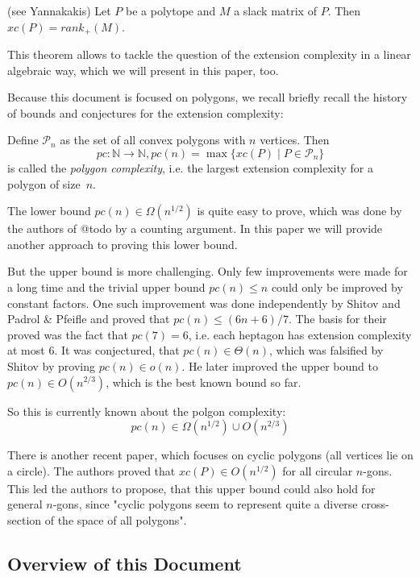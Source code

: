 \begin{theorem}(see Yannakakis)
  Let $P$ be a polytope and $M$ a slack matrix of $P$. Then $xc(P) = rank_+(M)$.
\end{theorem}

This theorem allows to tackle the question of the extension complexity in a linear algebraic way, which we will present in this paper, too.

Because this document is focused on polygons, we recall briefly recall the history of bounds and conjectures for the extension complexity:

Define $\mathcal{P}_n$ as the set of all convex polygons with $n$ vertices. Then $$pc:\mathbb{N} \to \mathbb{N}, pc(n) = \max \{xc(P) \mid P \in \mathcal{P}_n\}$$ is called the \textit{polygon complexity}, i.e. the largest extension complexity for a polygon of size~$n$.

The lower bound $pc(n) \in \Omega(n^{1/2})$ is quite easy to prove, which was done by the authors of @todo by a counting argument. In this paper we will provide another approach to proving this lower bound. 

But the upper bound is more challenging. Only few improvements were made for a long time and the trivial upper bound $pc(n) \leq n$ could only be improved by constant factors. One such improvement was done independently by Shitov and Padrol \& Pfeifle and proved that $pc(n) \leq (6n+6)/7$. The basis for their proved was the fact that $pc(7)=6$, i.e. each heptagon has extension complexity at most 6.
It was conjectured, that $pc(n) \in \Theta(n)$, which was falsified by Shitov by proving $pc(n) \in o(n)$. He later improved the upper bound to $pc(n) \in O(n^{2/3})$, which is the best known bound so far.

So this is currently known about the polgon complexity:
$$pc(n) \in \Omega(n^{1/2}) \cup O(n^{2/3})$$

There is another recent paper, which focuses on cyclic polygons (all vertices lie on a circle). The authors proved that $xc(P) \in O(n^{1/2})$ for all circular $n$-gons. 
This led the authors to propose, that this upper bound could also hold for general $n$-gons, since "cyclic polygons seem to represent quite a diverse cross-section of the space of all polygons".



\subsection{Overview of this Document}

